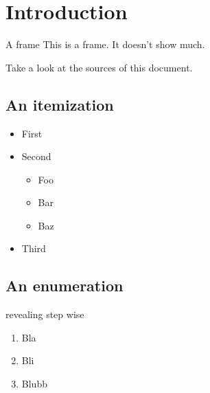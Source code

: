 \section{Introduction}
\begin{frame}{}{A frame}%
  This is a frame. It doesn't show much.

  Take a look at the sources of this document.
\end{frame}%
\subsection{An itemization}
\begin{frame}{}{}%
  \begin{itemize}
    \item First
    \item Second
      \begin{itemize}
        \item Foo
        \item Bar
        \item Baz
      \end{itemize}
    \item Third
  \end{itemize}
\end{frame}%
\subsection{An enumeration}
\begin{frame}{}{revealing step wise}%
  \begin{enumerate}[<+->]
    \item Bla
    \item Bli
    \item Blubb
  \end{enumerate}
\end{frame}%
